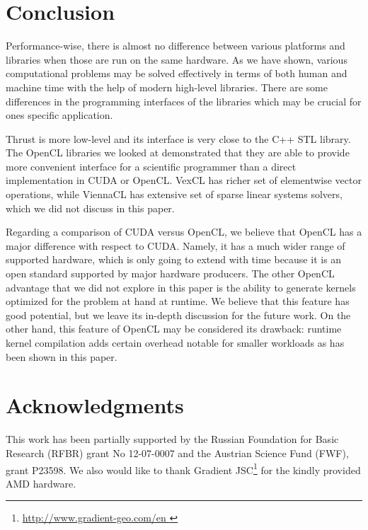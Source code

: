 \documentclass[final]{siamltex}
\begin{document}
%
%
\section{Conclusion}

Performance-wise, there is almost no difference between various platforms and
libraries when those are run on the same hardware. As we have shown, various
computational problems may be solved effectively in terms of both human and
machine time with the help of modern high-level libraries.  There are some
differences in the programming interfaces of the libraries which may be crucial
for ones specific application.

Thrust is more low-level and its interface is very close to the C++ STL
library.  The OpenCL libraries we looked at demonstrated that they are able to
provide more convenient interface for a scientific programmer than a direct
implementation in CUDA or OpenCL.  VexCL has richer set of elementwise vector
operations, while ViennaCL has extensive set of sparse linear systems solvers,
which we did not discuss in this paper.

Regarding a comparison of CUDA versus OpenCL, we believe that OpenCL has a
major difference with respect to CUDA. Namely, it has a  much wider range of
supported hardware, which is only going to extend with time because it is an
open standard supported by major hardware producers. The other OpenCL advantage
that we did not explore in this paper is the ability to generate kernels
optimized for the problem at hand at runtime. We believe that this feature has
good potential, but we leave its in-depth discussion for the future work.  On
the other hand, this feature of OpenCL may be considered its drawback: runtime
kernel compilation adds certain overhead notable for smaller workloads as has
been shown in this paper.





\section{Acknowledgments}

This work has been partially supported by the Russian Foundation for Basic 
Research (RFBR) grant No 12-07-0007 and the Austrian Science Fund (FWF), grant P23598.
We also would like to thank Gradient JSC\footnote{ \href{
http://www.gradient-geo.com/en }{ http://www.gradient-geo.com/en } } for the
kindly provided AMD hardware.




\end{document}
